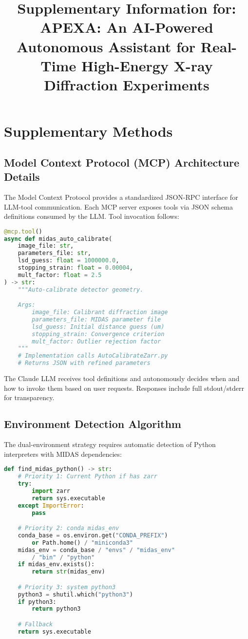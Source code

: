 \documentclass[11pt]{article}
\title{\textbf{Supplementary Information for:\\APEXA: An AI-Powered Autonomous Assistant for Real-Time High-Energy X-ray Diffraction Experiments}}
\begin{document}
\maketitle

\section{Supplementary Methods}

\subsection{Model Context Protocol (MCP) Architecture Details}

The Model Context Protocol provides a standardized JSON-RPC interface for LLM-tool communication. Each MCP server exposes tools via JSON schema definitions consumed by the LLM. Tool invocation follows:

\begin{lstlisting}[language=Python, caption=MCP Tool Definition Example]
@mcp.tool()
async def midas_auto_calibrate(
    image_file: str,
    parameters_file: str,
    lsd_guess: float = 1000000.0,
    stopping_strain: float = 0.00004,
    mult_factor: float = 2.5
) -> str:
    """Auto-calibrate detector geometry.

    Args:
        image_file: Calibrant diffraction image
        parameters_file: MIDAS parameter file
        lsd_guess: Initial distance guess (um)
        stopping_strain: Convergence criterion
        mult_factor: Outlier rejection factor
    """
    # Implementation calls AutoCalibrateZarr.py
    # Returns JSON with refined parameters
\end{lstlisting}

The Claude LLM receives tool definitions and autonomously decides when and how to invoke them based on user requests. Responses include full stdout/stderr for transparency.

\subsection{Environment Detection Algorithm}

The dual-environment strategy requires automatic detection of Python interpreters with MIDAS dependencies:

\begin{lstlisting}[language=Python, caption=MIDAS Python Detection]
def find_midas_python() -> str:
    # Priority 1: Current Python if has zarr
    try:
        import zarr
        return sys.executable
    except ImportError:
        pass

    # Priority 2: conda midas_env
    conda_base = os.environ.get("CONDA_PREFIX")
        or Path.home() / "miniconda3"
    midas_env = conda_base / "envs" / "midas_env"
        / "bin" / "python"
    if midas_env.exists():
        return str(midas_env)

    # Priority 3: system python3
    python3 = shutil.which("python3")
    if python3:
        return python3

    # Fallback
    return sys.executable
\end{lstlisting}
\end{document}
